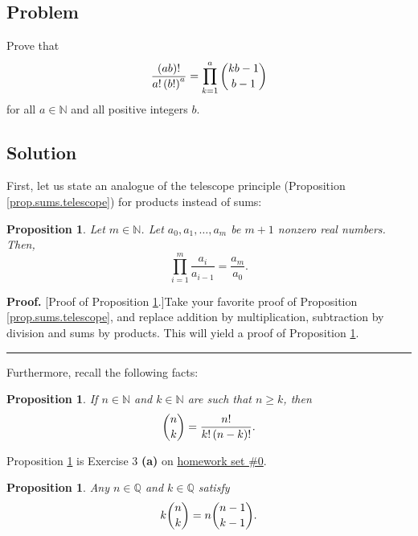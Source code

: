 \documentclass[paper=a4, fontsize=12pt]{scrartcl}%
\let\prodnonlimits\prod
\renewcommand{\prod}{\prodnonlimits\limits}
\theoremstyle{plainsl}
\newtheorem{proposition}[theorem]{Proposition}
\theoremstyle{definition}
\theoremstyle{remark}
\newenvironment{proof}[1][Proof]{\noindent\textbf{#1.} }{\ \rule{0.5em}{0.5em}}
\begin{document}
\subsection{Problem}

Prove that
\[
\dfrac{\left(  ab \right)  !}{a! \left(  b! \right)  ^{a}} = \prod_{k=1}^{a}
\dbinom{kb-1}{b-1}
\]
for all $a \in\mathbb{N}$ and all positive integers $b$.

\subsection{Solution}

First, let us state an analogue of the telescope principle (Proposition
\ref{prop.sums.telescope}) for products instead of sums:

\begin{proposition}
\label{prop.sums.telescope-prod}Let $m\in\mathbb{N}$. Let $a_{0},a_{1}%
,\ldots,a_{m}$ be $m+1$ nonzero real numbers. Then,
\[
\prod_{i=1}^{m}\dfrac{a_{i}}{a_{i-1}}=\dfrac{a_{m}}{a_{0}}.
\]

\end{proposition}

\begin{proof}
[Proof of Proposition \ref{prop.sums.telescope-prod}.]Take your favorite proof
of Proposition \ref{prop.sums.telescope}, and replace addition by
multiplication, subtraction by division and sums by products. This will yield
a proof of Proposition \ref{prop.sums.telescope-prod}.
\end{proof}

Furthermore, recall the following facts:

\begin{proposition}
\label{prop.sol.binom.102.fac-form}If $n\in\mathbb{N}$ and $k\in\mathbb{N}$
are such that $n\geq k$, then
\[
\dbinom{n}{k}=\dfrac{n!}{k!\left(  n-k\right)  !}.
\]

\end{proposition}

Proposition \ref{prop.sol.binom.102.fac-form} is Exercise 3 \textbf{(a)} on
\href{http://www-users.math.umn.edu/~dgrinber/19s/hw0s.pdf}{homework set \#0}.

\begin{proposition}
\label{prop.sol.binom.102.absorb}Any $n\in\mathbb{Q}$ and $k\in\mathbb{Q}$
satisfy
\[
k\dbinom{n}{k}=n\dbinom{n-1}{k-1}.
\]

\end{proposition}
\end{document}
